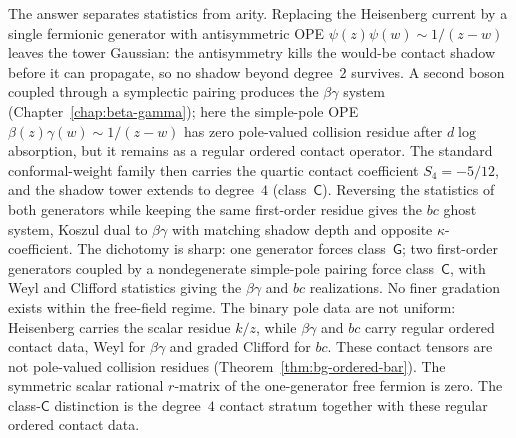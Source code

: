 The answer separates statistics from arity. Replacing the Heisenberg
current by a single fermionic generator with antisymmetric OPE
$\psi(z)\psi(w) \sim 1/(z{-}w)$ leaves the tower Gaussian: the
antisymmetry kills the would-be contact shadow before it can
propagate, so no shadow beyond degree~$2$ survives. A second boson
coupled through a symplectic pairing
produces the $\beta\gamma$ system (Chapter~\ref{chap:beta-gamma});
here the simple-pole OPE $\beta(z)\gamma(w) \sim 1/(z{-}w)$ has zero
pole-valued collision residue after $d\log$ absorption, but it remains
as a regular ordered contact operator. The standard conformal-weight
family then carries the quartic contact coefficient
$S_4=-5/12$, and the shadow tower extends to degree~$4$
(class~$\mathsf{C}$). Reversing the
statistics of both generators while keeping the same first-order
residue gives the $bc$ ghost system, Koszul dual to
$\beta\gamma$ with matching shadow depth and opposite
$\kappa$-coefficient. The dichotomy is sharp: one generator forces
class~$\mathsf{G}$; two first-order generators coupled by a
nondegenerate simple-pole pairing force class~$\mathsf{C}$, with
Weyl and Clifford statistics giving the $\beta\gamma$ and $bc$
realizations. No finer gradation exists within the free-field regime.
The binary pole data are not uniform: Heisenberg carries the scalar
residue $k/z$, while $\beta\gamma$ and $bc$ carry regular ordered
contact data, Weyl for $\beta\gamma$ and graded Clifford for $bc$.
These contact tensors are not pole-valued collision residues
(Theorem~\ref{thm:bg-ordered-bar}). The symmetric scalar
rational $r$-matrix of the one-generator free fermion is zero.
The class-$\mathsf{C}$ distinction is the degree~$4$ contact
stratum together with these regular ordered contact data.

